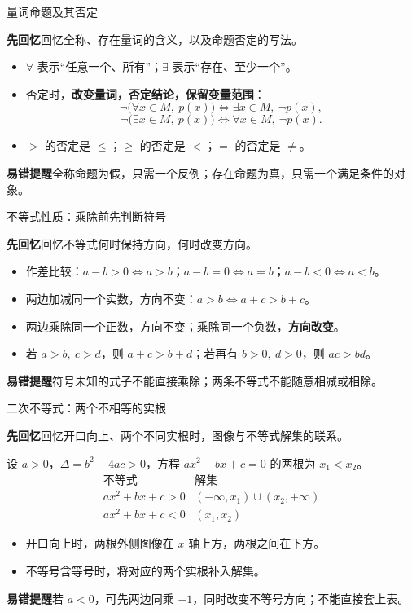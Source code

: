 \documentclass[UTF8,10pt,aspectratio=169]{ctexbeamer}
\newcommand{\Recall}[1]{\par\noindent\textcolor{KnowledgeBlue}{\textbf{先回忆}\quad #1}\par\vspace{0.3cm}}
\newcommand{\Pitfall}[1]{\par\vspace{0.22cm}\noindent\textbf{易错提醒}\quad #1\par}
\begin{document}
\begin{frame}[t]{量词命题及其否定}
\large
\Recall{回忆全称、存在量词的含义，以及命题否定的写法。}
\pause
\begin{itemize}
  \item $\forall$ 表示“任意一个、所有”；$\exists$ 表示“存在、至少一个”。
  \item 否定时，\textbf{改变量词，否定结论，保留变量范围}：
  \[
    \neg\bigl(\forall x\in M,\ p(x)\bigr)\iff\exists x\in M,\ \neg p(x),
  \]
  \[
    \neg\bigl(\exists x\in M,\ p(x)\bigr)\iff\forall x\in M,\ \neg p(x).
  \]
  \item $>$ 的否定是 $\le$；$\ge$ 的否定是 $<$；$=$ 的否定是 $\ne$。
\end{itemize}
\Pitfall{全称命题为假，只需一个反例；存在命题为真，只需一个满足条件的对象。}
\end{frame}

\begin{frame}[t]{不等式性质：乘除前先判断符号}
\large
\Recall{回忆不等式何时保持方向，何时改变方向。}
\pause
\begin{itemize}
  \item 作差比较：$a-b>0\iff a>b$；$a-b=0\iff a=b$；$a-b<0\iff a<b$。
  \item 两边加减同一个实数，方向不变：$a>b\iff a+c>b+c$。
  \item 两边乘除同一个正数，方向不变；乘除同一个负数，\textbf{方向改变}。
  \item 若 $a>b,\ c>d$，则 $a+c>b+d$；若再有 $b>0,\ d>0$，则 $ac>bd$。
\end{itemize}
\Pitfall{符号未知的式子不能直接乘除；两条不等式不能随意相减或相除。}
\end{frame}

\begin{frame}[t]{二次不等式：两个不相等的实根}
\large
\Recall{回忆开口向上、两个不同实根时，图像与不等式解集的联系。}
\pause
设 $a>0$，$\Delta=b^2-4ac>0$，方程 $ax^2+bx+c=0$ 的两根为 $x_1<x_2$。
\[
\begin{array}{c|c}
\text{不等式}&\text{解集}\\ \hline
ax^2+bx+c>0&(-\infty,x_1)\cup(x_2,+\infty)\\[0.13cm]
ax^2+bx+c<0&(x_1,x_2)
\end{array}
\]
\begin{itemize}
  \item 开口向上时，两根外侧图像在 $x$ 轴上方，两根之间在下方。
  \item 不等号含等号时，将对应的两个实根补入解集。
\end{itemize}
\Pitfall{若 $a<0$，可先两边同乘 $-1$，同时改变不等号方向；不能直接套上表。}
\end{frame}
\end{document}
